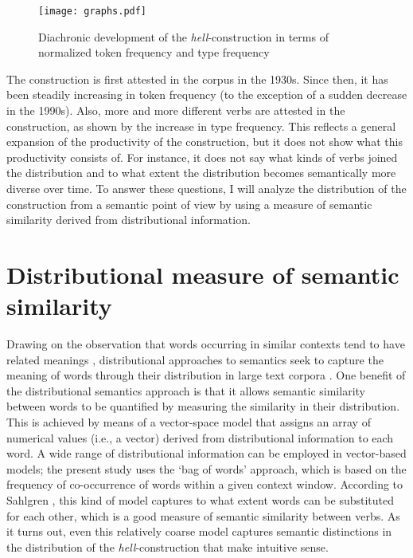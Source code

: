 \documentclass[11pt]{article}
\begin{document}
\begin{figure}[ht]
\centering
\texttt{[image: graphs.pdf]}
\caption{Diachronic development of the \textit{hell}-construction in terms of normalized token frequency and type frequency}\label{graph}
\end{figure}

The construction is first attested in the corpus in the 1930s. Since then, it has been steadily increasing in token frequency (to the exception of a sudden decrease in the 1990s). Also, more and more different verbs are attested in the construction, as shown by the increase in type frequency. This reflects a general expansion of the productivity of the construction, but it does not show what this productivity consists of. For instance, it does not say what kinds of verbs joined the distribution and to what extent the distribution becomes semantically more diverse over time. To answer these questions, I will analyze the distribution of the construction from a semantic point of view by using a measure of semantic similarity derived from distributional information.

\section{Distributional measure of semantic similarity}

Drawing on the observation that words occurring in similar contexts tend to have related meanings \cite{MillerCharles1991}, distributional approaches to semantics seek to capture the meaning of words through their distribution in large text corpora \cite{Lenci2008,TurneyPantel2010,Erk2012}. One benefit of the distributional semantics approach is that it allows semantic similarity between words to be quantified by measuring the similarity in their distribution. This is achieved by means of a vector-space model that assigns an array of numerical values (i.e., a vector) derived from distributional information to each word. A wide range of distributional information can be employed in vector-based models; the present study uses the `bag of words' approach, which is based on the frequency of co-occurrence of words within a given context window. According to Sahlgren , this kind of model captures to what extent words can be substituted for each other, which is a good measure of semantic similarity between verbs. As it turns out, even this relatively coarse model captures semantic distinctions in the distribution of the \textit{hell}-construction that make intuitive sense.
 
\end{document}
